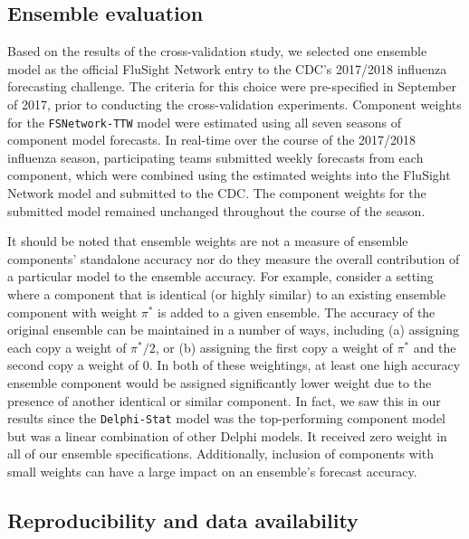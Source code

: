 \documentclass{article}\usepackage[]{graphicx}\usepackage[]{color}
\begin{document}
\subsection{Ensemble evaluation}

Based on the results of the cross-validation study, we selected one ensemble model as the official FluSight Network entry to the CDC's 2017/2018 influenza forecasting challenge.
The criteria for this choice were pre-specified in September of 2017, prior to conducting the cross-validation experiments.\cite{Reich2017github} 
Component weights for the {\tt FSNetwork-TTW} model were estimated using all seven seasons of component model forecasts. In real-time over the course of the 2017/2018 influenza season, participating teams submitted weekly forecasts from each component, which were combined using the estimated weights into the FluSight Network model and submitted to the CDC. The component weights for the submitted model remained unchanged throughout the course of the season.

It should be noted that ensemble weights are not a measure of ensemble components' standalone accuracy nor do they measure the overall contribution of a particular model to the ensemble accuracy.
For example, consider a setting where a component that is identical (or highly similar) to an existing ensemble component with weight $\pi^*$ is added to a given ensemble. 
The accuracy of the original ensemble can be maintained in a number of ways, including (a) assigning each copy a weight of $\pi^*/2$, or (b) assigning the first copy a weight of $\pi^*$ and the second copy a weight of $0$. 
In both of these weightings, at least one high accuracy ensemble component would be assigned significantly lower weight due to the presence of another identical or similar component.
In fact, we saw this in our results since the {\tt Delphi-Stat} model was the top-performing component model but was a linear combination of other Delphi models.
It received zero weight in all of our ensemble specifications.
Additionally, inclusion of components with small weights can have a large impact on an ensemble's forecast accuracy.
\subsection{Reproducibility and data availability}
\end{document}
